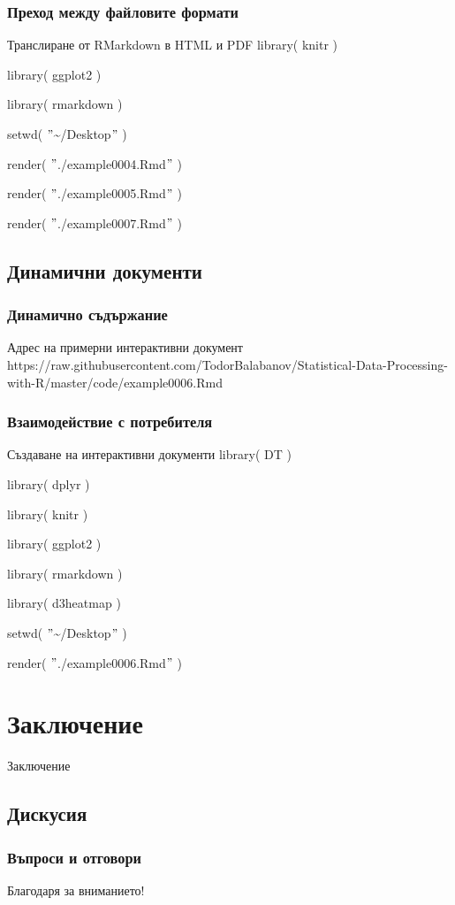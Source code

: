 \documentclass{beamer}
\begin{document}
\begin{frame}
\frametitle{Преход между файловите формати}
\begin{block}{Транслиране от RMarkdown в HTML и PDF}
library( knitr )

library( ggplot2 )

library( rmarkdown )

setwd( $"$\textasciitilde /Desktop$"$ )

render( $"$./example0004.Rmd$"$ )

render( $"$./example0005.Rmd$"$ )

render( $"$./example0007.Rmd$"$ )
\end{block}
\end{frame}

\subsection{Динамични документи}

\begin{frame}
\frametitle{Динамично съдържание}
\begin{block}{Адрес на примерни интерактивни документ}
https://raw.githubusercontent.com/TodorBalabanov/Statistical-Data-Processing-with-R/master/code/example0006.Rmd
\end{block}
\end{frame}

\begin{frame}
\frametitle{Взаимодействие с потребителя}
\begin{block}{Създаване на интерактивни документи}
library( DT )

library( dplyr )

library( knitr )

library( ggplot2 )

library( rmarkdown )

library( d3heatmap )

setwd( $"$\textasciitilde /Desktop$"$ )

render( $"$./example0006.Rmd$"$ )
\end{block}
\end{frame}

\section{Заключение}

\begin{frame}
\center \huge{Заключение}
\end{frame}

\subsection{Дискусия}

\begin{frame}
\frametitle{Въпроси и отговори}
\center \huge{Благодаря за вниманието!}
\end{frame}
\end{document}
